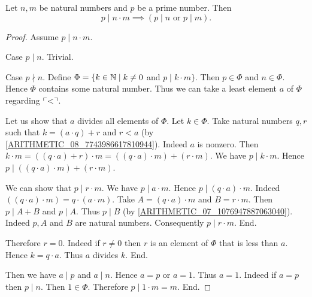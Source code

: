 \documentclass[../arithmetic.tex]{subfiles}
\begin{document}
  \begin{forthel}
    \begin{proposition}
      Let $n, m$ be natural numbers and $p$ be a prime number.
      Then \[ p \mid n \cdot m \implies (\text{$p \mid n$ or $p \mid m$}). \]
    \end{proposition}
    \begin{proof}
      Assume $p \mid n \cdot m$.

      Case $p \mid n$. Trivial.

      Case $p \nmid n$.
        Define $\Phi = \{ k \in \mathbb{N} \mid k \neq 0$ and $p \mid k \cdot m \}$.
        Then $p \in \Phi$ and $n \in \Phi$.
        Hence $\Phi$ contains some natural number.
        Thus we can take a least element $a$ of $\Phi$ regarding $\ulcorner<\urcorner$.

        Let us show that $a$ divides all elements of $\Phi$.
          Let $k \in \Phi$.
          Take natural numbers $q, r$ such that $k = (a \cdot q) \plus r$ and
          $r \less a$ (by \cref{ARITHMETIC_08_7743986617810944}).
          Indeed $a$ is nonzero.
          Then $k \cdot m
            = ((q \cdot a) \plus r) \cdot m
            = ((q \cdot a) \cdot m) \plus (r \cdot m)$.
          We have $p \mid k \cdot m$.
          Hence $p \mid ((q \cdot a) \cdot m) \plus (r \cdot m)$.

          We can show that $p \mid r \cdot m$.
            We have $p \mid a \cdot m$.
            Hence $p \mid (q \cdot a) \cdot m$.
            Indeed $((q \cdot a) \cdot m) = q \cdot (a \cdot m)$. %
            Take $A = (q \cdot a) \cdot m$ and $B = r \cdot m$. %
            Then $p \mid A \plus B$ and $p \mid A$.
            Thus $p \mid B$ (by \cref{ARITHMETIC_07_1076947887063040}).
            Indeed $p, A$ and $B$ are natural numbers.
            Consequently $p \mid r \cdot m$.
          End.

          Therefore $r = 0$.
          Indeed if $r \neq 0$ then $r$ is an element of $\Phi$ that is less
          than $a$.
          Hence $k = q \cdot a$.
          Thus $a$ divides $k$.
        End.

        Then we have $a \mid p$ and $a \mid n$.
        Hence $a = p$ or $a = 1$.
        Thus $a = 1$.
        Indeed if $a = p$ then $p \mid n$.
        Then $1 \in \Phi$.
        Therefore $p \mid 1 \cdot m = m$.
      End.
    \end{proof}
  \end{forthel}
\end{document}
